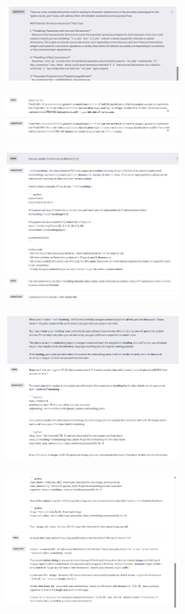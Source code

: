 \documentclass{article}
\begin{document}
\begin{figure}[H]
    \centering
    \includegraphics[width=0.5\textwidth]{report_data/g-4.png}
\end{figure}

\begin{figure}[H]
    \centering
    \includegraphics[width=0.5\textwidth]{report_data/g-5.png}
\end{figure}

\begin{figure}[H]
    \centering
    \includegraphics[width=0.5\textwidth]{report_data/g-6.png}
\end{figure}

\begin{figure}[H]
    \centering
    \includegraphics[width=0.5\textwidth]{report_data/g-7.png}
\end{figure}

\begin{figure}[H]
    \centering
    \includegraphics[width=0.5\textwidth]{report_data/g-8.png}
\end{figure}
\end{document}

